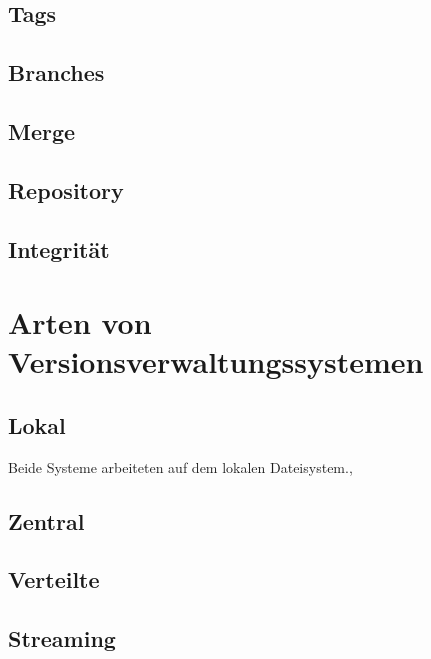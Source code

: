 \subsection{Tags}\label{sec:Tags}
\subsection{Branches}\label{sec:Branches}
\subsection{Merge}
\subsection{Repository}

\subsection{Integrität}

\section{Arten von Versionsverwaltungssystemen}
\subsection{Lokal}
Beide Systeme arbeiteten auf dem lokalen
Dateisystem.,
\subsection{Zentral}
\subsection{Verteilte}
\subsection{Streaming}

\label{sec:why}

